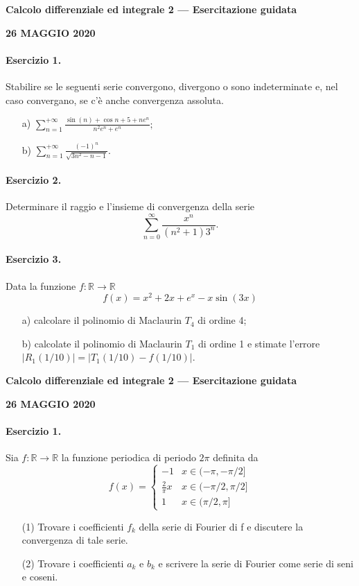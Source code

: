 \documentclass[a4paper, 10pt]{article}
\newcommand{\sectiontitle}[1]{\begin{center}\large\bfseries #1\end{center}}
\newcommand{\exercisecenter}[1]{\begin{center}\bfseries #1\end{center}}
\begin{document}
\newpage

\sectiontitle{Calcolo differenziale ed integrale 2 --- Esercitazione guidata}
\exercisecenter{26 MAGGIO 2020}

\paragraph{Esercizio 1.} Stabilire se le seguenti serie convergono, divergono o sono indeterminate e, nel caso convergano, se c'è anche convergenza assoluta.
\begin{enumerate}
    \item[a)] $\displaystyle \sum_{n=1}^{+\infty}\frac{\sin(n)+\cos n+5+ne^{n}}{n^{2}e^{n}+e^{n}};$
    \item[b)] $\displaystyle \sum_{n=1}^{+\infty}\frac{(-1)^{n}}{\sqrt{3n^{2}-n-1}}.$
\end{enumerate}

\paragraph{Esercizio 2.} Determinare il raggio e l'insieme di convergenza della serie
\[ \sum_{n=0}^{\infty}\frac{x^{n}}{(n^{2}+1)3^{n}}. \]

\paragraph{Esercizio 3.} Data la funzione $f:\mathbb{R}\rightarrow\mathbb{R}$
\[ f(x)=x^{2}+2x+e^{x}-x\sin(3x) \]
\begin{enumerate}
    \item[a)] calcolare il polinomio di Maclaurin $T_{4}$ di ordine 4;
    \item[b)] calcolate il polinomio di Maclaurin $T_{1}$ di ordine 1 e stimate l'errore $|R_{1}(1/10)|=|T_{1}(1/10)-f(1/10)|$.
\end{enumerate}

\newpage

\sectiontitle{Calcolo differenziale ed integrale 2 --- Esercitazione guidata}
\exercisecenter{26 MAGGIO 2020}

\paragraph{Esercizio 1.} Sia $f:\mathbb{R}\rightarrow\mathbb{R}$ la funzione periodica di periodo $2\pi$ definita da
\[ f(x)=\begin{cases}-1 & x\in(-\pi,-\pi/2]\\ \frac{2}{\pi}x & x\in(-\pi/2,\pi/2]\\ 1 & x\in(\pi/2,\pi]\end{cases} \]
\begin{enumerate}
    \item[(1)] Trovare i coefficienti $f_{k}$ della serie di Fourier di f e discutere la convergenza di tale serie.
    \item[(2)] Trovare i coefficienti $a_{k}$ e $b_{k}$ e scrivere la serie di Fourier come serie di seni e coseni.
\end{enumerate}
\end{document}
